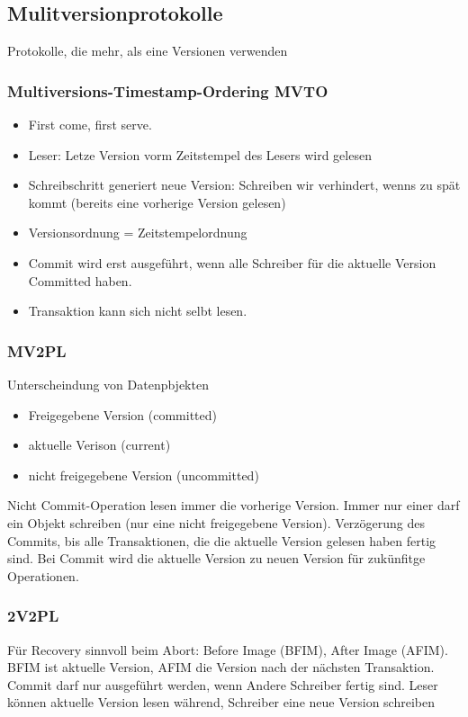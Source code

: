 \documentclass[ngerman]{scrartcl}
\begin{document}
\subsection{Mulitversionprotokolle}
Protokolle, die mehr, als eine Versionen verwenden
\subsubsection{Multiversions-Timestamp-Ordering MVTO}

\begin{itemize}
  \item First come, first serve.
  \item Leser: Letze Version vorm Zeitstempel des Lesers wird gelesen
  \item Schreibschritt generiert neue Version: Schreiben wir verhindert, wenns zu spät kommt (bereits eine vorherige Version gelesen) 
  \item Versionsordnung = Zeitstempelordnung
  \item Commit wird erst ausgeführt, wenn alle Schreiber für die aktuelle Version Committed haben.
  \item Transaktion kann sich nicht selbt lesen.
\end{itemize}  

\subsubsection{MV2PL}
Unterscheindung von Datenpbjekten
\begin{itemize}
  \item Freigegebene Version (committed)
  \item aktuelle Verison (current)
  \item nicht freigegebene Version  (uncommitted)
\end{itemize}
Nicht Commit-Operation lesen immer die vorherige Version. Immer nur einer darf ein Objekt schreiben (nur eine nicht freigegebene Version). Verzögerung des Commits, bis alle Transaktionen, die die aktuelle Version gelesen haben fertig sind. Bei Commit wird die aktuelle Version zu neuen Version für zukünfitge Operationen. 

\subsubsection{2V2PL}
Für Recovery sinnvoll beim Abort: Before Image (BFIM), After Image (AFIM). BFIM ist aktuelle Version, AFIM die Version nach der nächsten Transaktion. Commit darf nur ausgeführt werden, wenn Andere Schreiber fertig sind. Leser können aktuelle Version lesen während, Schreiber eine neue Version schreiben 
\end{document}
